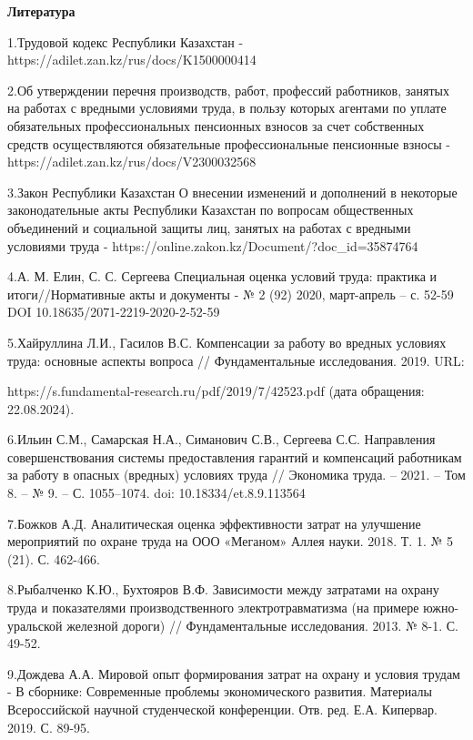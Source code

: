 \begin{center}
{\bfseries Литература}
\end{center}

\begin{noparindent}
1.Трудовой кодекс Республики Казахстан -
https://adilet.zan.kz/rus/docs/K1500000414

2.Об утверждении перечня производств, работ, профессий работников,
занятых на работах с вредными условиями труда, в пользу которых агентами
по уплате обязательных профессиональных пенсионных взносов за счет
собственных средств осуществляются обязательные профессиональные
пенсионные взносы - https://adilet.zan.kz/rus/docs/V2300032568

3.Закон Республики Казахстан О внесении изменений и дополнений в
некоторые законодательные акты Республики Казахстан по вопросам
общественных объединений и социальной защиты лиц, занятых на работах с
вредными условиями труда -
https://online.zakon.kz/Document/?doc\_id=35874764

4.А. М. Елин, С. С. Сергеева Специальная оценка условий труда: практика
и итоги//Нормативные акты и документы - № 2 (92) 2020, март-апрель -- с.
52-59 DOI 10.18635/2071-2219-2020-2-52-59

5.Хайруллина Л.И., Гасилов В.С. Компенсации за работу во вредных
условиях труда: основные аспекты вопроса // Фундаментальные
исследования. 2019. URL:

https://s.fundamental-research.ru/pdf/2019/7/42523.pdf (дата обращения:
22.08.2024).

6.Ильин С.М., Самарская Н.А., Симанович С.В., Сергеева С.С. Направления
совершенствования системы предоставления гарантий и компенсаций
работникам за работу в опасных (вредных) условиях труда // Экономика
труда. -- 2021. -- Том 8. -- № 9. -- С. 1055--1074. doi:
10.18334/et.8.9.113564

7.Божков А.Д. Аналитическая оценка эффективности затрат на улучшение
мероприятий по охране труда на ООО «Меганом» Аллея науки. 2018. Т. 1. №
5 (21). С. 462-466.

8.Рыбалченко К.Ю., Бухтояров В.Ф. Зависимости между затратами на охрану
труда и показателями производственного электротравматизма (на примере
южно-уральской железной дороги) // Фундаментальные исследования. 2013. №
8-1. С. 49-52.

9.Дождева А.А. Мировой опыт формирования затрат на охрану и условия
трудам - В сборнике: Современные проблемы экономического развития.
Материалы Всероссийской научной студенческой конференции. Отв. ред. Е.А.
Кипервар. 2019. С. 89-95.


\end{noparindent}
